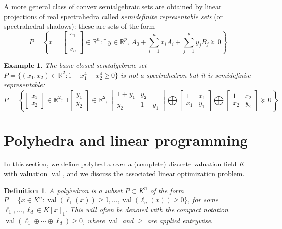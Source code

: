 \documentclass[a4paper,12pt]{article}
\newtheorem{definition}{Definition}
\newtheorem{example}{Example}
\newcommand{\R}{\mathbb{R}} %
\DeclareMathOperator{\val}{val}
\begin{document}
A more general class of convex semialgebraic sets are obtained by linear projections of real spectrahedra
called {\it semidefinite representable sets} (or spectrahedral shadows): these are sets of the form
$$
P = \left\{x = \left[\begin{smallmatrix} x_1 \\ \vdots \\ x_n \end{smallmatrix}\right] \in \R^n : \exists\,y\in\R^p, \, A_0 + \sum_{i=1}^n x_i A_i + \sum_{j=1}^p y_j B_j \succeq 0\right\}
$$

\begin{example}
\label{fermat_quartic}
The basic closed semialgebraic set $P = \{(x_1,x_2) \in \R^2 : 1-x_1^4-x_2^4 \geq 0\}$ is not a spectrahedron
but it is semidefinite representable:
$$
P = \left\{\begin{bmatrix} x_1 \\ x_2 \end{bmatrix} \in \R^2 :
\exists\,
\begin{bmatrix} y_1 \\ y_2 \end{bmatrix} \in \R^2, \,
\begin{bmatrix}
  1+y_1 & y_2 \\
  y_2 & 1-y_1
\end{bmatrix}
\bigoplus
\begin{bmatrix}
  1 & x_1 \\
  x_1 & y_1
\end{bmatrix}
\bigoplus
\begin{bmatrix}
  1 & x_2 \\
  x_2 & y_2
\end{bmatrix}
\succeq 0
\right\}
$$
\end{example}


\section{Polyhedra and linear programming}


In this section, we define polyhedra over a (complete) discrete valuation field $K$ with valuation $\val$,
and we discuss the associated linear optimization problem.

\begin{definition}
  A {\it polyhedron} is a subset $P \subset K^n$ of the form
  $P = \{x \in K^n : \val(\ell_1(x))\geq0,\ldots,\val(\ell_n(x))\geq 0\}$,
  for some $\ell_1,\ldots,\ell_d \in K[x]_1$. This will often be denoted with
  the compact notation $\val(\ell_1 \oplus \cdots \oplus \ell_d) \geq 0$, where $\val$
  and $\geq$ are applied entrywise.
\end{definition}
\end{document}
